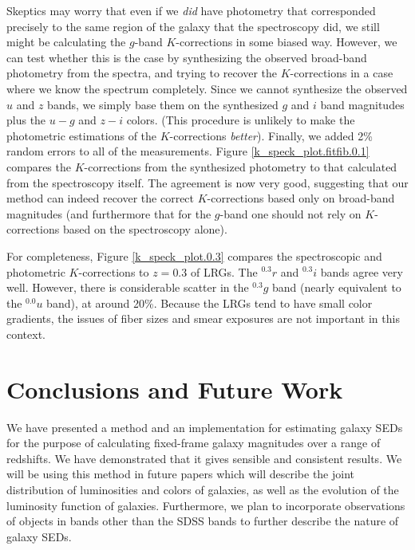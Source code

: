 \documentclass[10pt,preprint]{aastex}
\newcommand{\band}[2]{\ensuremath{^{#1}\!{#2}}}
\begin{document}
Skeptics may worry that even if we {\it did} have photometry that
corresponded precisely to the same region of the galaxy that the
spectroscopy did, we still might be calculating the $g$-band
$K$-corrections in some biased way. However, we can test whether this
is the case by synthesizing the observed broad-band photometry from
the spectra, and trying to recover the $K$-corrections in a case where
we know the spectrum completely. Since we cannot synthesize the
observed $u$ and $z$ bands, we simply base them on the synthesized $g$
and $i$ band magnitudes plus the $u-g$ and $z-i$ colors. (This
procedure is unlikely to make the photometric estimations of the
$K$-corrections {\it better}). Finally, we added 2\% random errors to
all of the measurements. Figure \ref{k_speck_plot.fitfib.0.1} compares
the $K$-corrections from the synthesized photometry to that calculated
from the spectroscopy itself. The agreement is now very good,
suggesting that our method can indeed recover the correct
$K$-corrections based only on broad-band magnitudes (and furthermore
that for the $g$-band one should not rely on $K$-corrections based on
the spectroscopy alone).

For completeness, Figure \ref{k_speck_plot.0.3} compares the
spectroscopic and photometric $K$-corrections to $z=0.3$ of LRGs. The
\band{0.3}{r} and \band{0.3}{i} bands agree very well. However, there
is considerable scatter in the \band{0.3}{g} band (nearly equivalent
to the \band{0.0}{u} band), at around 20\%. Because the LRGs tend to
have small color gradients, the issues of fiber sizes and smear
exposures are not important in this context.

\section{Conclusions and Future Work}
\label{conclusions}

We have presented a method and an implementation for estimating galaxy
SEDs for the purpose of calculating fixed-frame galaxy magnitudes over
a range of redshifts. We have demonstrated that it gives sensible and
consistent results. We will be using this method in future papers
which will describe the joint distribution of luminosities and colors
of galaxies, as well as the evolution of the luminosity function of
galaxies. Furthermore, we plan to incorporate observations of objects
in bands other than the SDSS bands to further describe the nature of
galaxy SEDs.
\end{document}
